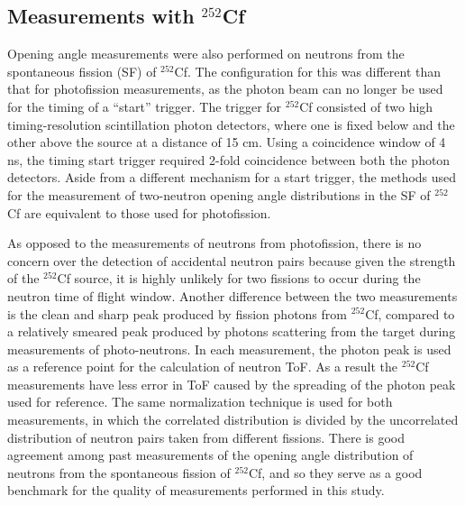 \subsection{Measurements with $^{252}$Cf}

Opening angle measurements were also performed on neutrons from the spontaneous fission (SF) of $^{252}$Cf.
The configuration for this was different than that for photofission measurements, as the photon beam can no longer be used for the timing of a ``start'' trigger.
The trigger for $^{252}$Cf consisted of two high timing-resolution scintillation photon detectors, where one is fixed below and the other above the source at a distance of 15 cm.
Using a coincidence window of 4 ns, the timing start trigger required 2-fold coincidence between both the photon detectors.
Aside from a different mechanism for a start trigger, the methods used for the measurement of two-neutron opening angle distributions in the SF of $^{252}$Cf are equivalent to those used for photofission.

As opposed to the measurements of neutrons from photofission, there is no concern over the detection of accidental neutron pairs because given the strength of the $^{252}$Cf source, it is highly unlikely for two fissions to occur during the neutron time of flight window.
Another difference between the two measurements is the clean and sharp peak produced by fission photons from $^{252}$Cf, compared to a relatively smeared peak produced by photons scattering from the target during measurements of photo-neutrons.
In each measurement, the photon peak is used as a reference point for the calculation of neutron ToF.
As a result the $^{252}$Cf measurements have less error in ToF caused by the spreading of the photon peak used for reference.
The same normalization technique is used for both measurements, in which the correlated distribution is divided by the uncorrelated distribution of neutron pairs taken from different fissions.
There is good agreement among past measurements of the opening angle distribution of neutrons from the spontaneous fission of $^{252}$Cf, and so they serve as a good benchmark for the quality of measurements performed in this study.


